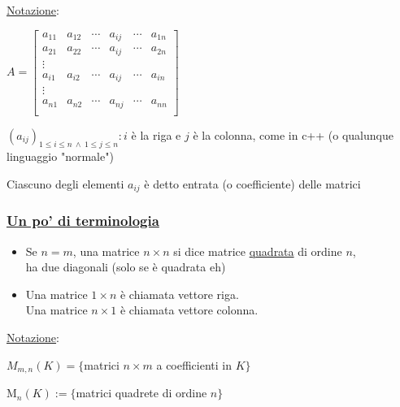 \documentclass{article}
\begin{document}

\ul{Notazione}:

$A=\begin{bmatrix}
		a_{11} & a_{12} & \cdots & a_{ij} & \cdots & a_{1n} \\
		a_{21} & a_{22} & \cdots & a_{ij} & \cdots & a_{2n} \\
		\vdots                                              \\
		a_{i1} & a_{i2} & \cdots & a_{ij} & \cdots & a_{in} \\
		\vdots                                              \\
		a_{n1} & a_{n2} & \cdots & a_{nj} & \cdots & a_{nn} \\
	\end{bmatrix}$

$(a_{ij})_{1\le i\le n\ \wedge\ 1\le j\le n}:i$ è la riga e $j$ è la colonna, come in c++ (o qualunque linguaggio "normale")

Ciascuno degli elementi $a_{ij}$ è detto entrata (o coefficiente) delle matrici

\subsubsection*{\ul{Un po' di terminologia}}
\begin{itemize}
	\item Se $n=m$, una matrice $n\times n$ si dice matrice \ul{quadrata} di ordine $n$,\\
	      ha due diagonali (solo se è quadrata eh)
	\item Una matrice $1\times n$ è chiamata vettore riga.\\
	      Una matrice $n\times1$ è chiamata vettore colonna.
\end{itemize}
\ul{Notazione}:

$M_{m,n}(K)=\{$matrici $n\times m$ a coefficienti in $K\}$

M$_{n}(K):=\{$matrici quadrete di ordine $n\}$
\end{document}
